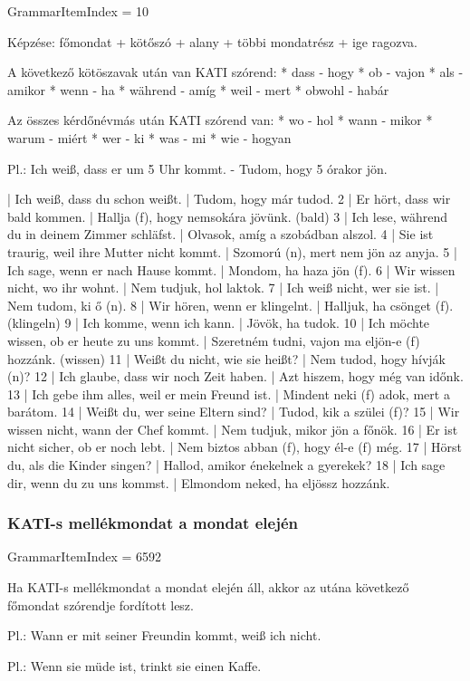 \documentclass{article}
\newenvironment{desc}{\verbatim}{\endverbatim}
\newenvironment{exmp}{\verbatim}{\endverbatim}
\begin{document}
GrammarItemIndex = 10

\begin{desc}
Képzése:
főmondat + kötőszó + alany + többi mondatrész + ige ragozva.

A következő kötöszavak után van KATI szórend:
* dass - hogy
* ob - vajon
* als - amikor
* wenn - ha
* während - amíg
* weil - mert
* obwohl - habár

Az összes kérdőnévmás után KATI szórend van:
* wo - hol
* wann - mikor
* warum - miért
* wer - ki
* was - mi
* wie - hogyan

Pl.: Ich weiß, dass er um 5 Uhr kommt. - Tudom, hogy 5 órakor jön.
\end{desc}

\begin{exmp}
1 | Ich weiß, dass du schon weißt. | Tudom, hogy már tudod.
2 | Er hört, dass wir bald kommen. | Hallja (f), hogy nemsokára jövünk. (bald)
3 | Ich lese, während du in deinem Zimmer schläfst. | Olvasok, amíg a szobádban alszol.
4 | Sie ist traurig, weil ihre Mutter nicht kommt. | Szomorú (n), mert nem jön az anyja.
5 | Ich sage, wenn er nach Hause kommt. | Mondom, ha haza jön (f).
6 | Wir wissen nicht, wo ihr wohnt. | Nem tudjuk, hol laktok.
7 | Ich weiß nicht, wer sie ist. | Nem tudom, ki ő (n).
8 | Wir hören, wenn er klingelnt. | Halljuk, ha csönget (f). (klingeln)
9 | Ich komme, wenn ich kann. | Jövök, ha tudok.
10 | Ich möchte wissen, ob er heute zu uns kommt. | Szeretném tudni, vajon ma eljön-e (f) hozzánk. (wissen)
11 | Weißt du nicht, wie sie heißt? | Nem tudod, hogy hívják (n)?
12 | Ich glaube, dass wir noch Zeit haben. | Azt hiszem, hogy még van időnk.
13 | Ich gebe ihm alles, weil er mein Freund ist. | Mindent neki (f) adok, mert a barátom.
14 | Weißt du, wer seine Eltern sind? | Tudod, kik a szülei (f)?
15 | Wir wissen nicht, wann der Chef kommt. | Nem tudjuk, mikor jön a főnök.
16 | Er ist nicht sicher, ob er noch lebt. | Nem biztos abban (f), hogy él-e (f) még.
17 | Hörst du, als die Kinder singen? | Hallod, amikor énekelnek a gyerekek?
18 | Ich sage dir, wenn du zu uns kommst. | Elmondom neked, ha eljössz hozzánk.
\end{exmp}

\subsubsection{KATI-s mellékmondat a mondat elején}

GrammarItemIndex = 6592

\begin{desc}
Ha KATI-s mellékmondat a mondat elején áll, akkor az utána következő főmondat szórendje fordított lesz.

Pl.: Wann er mit seiner Freundin kommt, weiß ich nicht.

Pl.: Wenn sie müde ist, trinkt sie einen Kaffe.
\end{desc}
\end{document}
